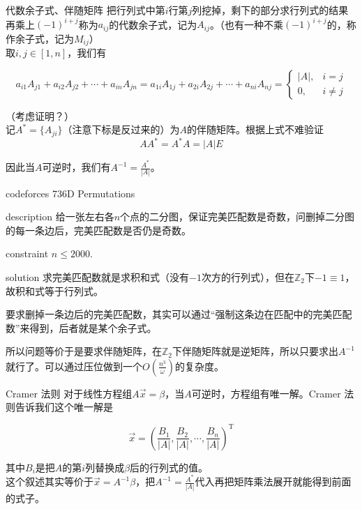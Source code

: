 \documentclass{beamer}
\begin{document}
\begin{frame}{代数余子式、伴随矩阵}
	把行列式中第$i$行第$j$列挖掉，剩下的部分求行列式的结果再乘上$(-1)^{i+j}$称为$a_{ij}$的代数余子式，记为$A_{ij}$。（也有一种不乘$(-1)^{i+j}$的，称作余子式，记为$M_{ij}$）\\
	
	取$i, j \in [1, n]$，我们有
	
	$$a_{i1}A_{j1} + a_{i2}A_{j2} + \cdots + a_{in}A_{jn} = a_{1i}A_{1j} + a_{2i}A_{2j} + \cdots + a_{ni}A_{nj} = \begin{cases}
		|A|, & i=j\\
		0, & i \neq j
	\end{cases}$$
	
	（考虑证明？）\\
	
	记$A^* = \{A_{ji}\}$（注意下标是反过来的）为$A$的伴随矩阵。根据上式不难验证$$AA^* = A^*A = |A|E$$
	
	因此当$A$可逆时，我们有$A^{-1} = \frac{A^*}{|A|}$。
\end{frame}

\begin{frame}{codeforces 736D Permutations}
\begin{block}{description}
	给一张左右各$n$个点的二分图，保证完美匹配数是奇数，问删掉二分图的每一条边后，完美匹配数是否仍是奇数。
\end{block}
\begin{block}{constraint}
	$n \le 2000.$
\end{block}
\pause
\begin{block}{solution}
	求完美匹配数就是求积和式（没有$-1$次方的行列式），但在$\mathbb Z_2$下$-1 \equiv 1$，故积和式等于行列式。
	
	要求删掉一条边后的完美匹配数，其实可以通过“强制这条边在匹配中的完美匹配数”来得到，后者就是某个余子式。
	
	所以问题等价于是要求伴随矩阵，在$\mathbb Z_2$下伴随矩阵就是逆矩阵，所以只要求出$A^{-1}$就行了。可以通过压位做到一个$O(\frac{n^3}{\omega})$的复杂度。
\end{block}
\end{frame}

\begin{frame}{Cramer 法则}
	对于线性方程组$A\vec{x} = \beta$，当$A$可逆时，方程组有唯一解。Cramer 法则告诉我们这个唯一解是
	
	$$\vec{x} = \left( \frac{B_1}{|A|}, \frac{B_2}{|A|}, \cdots, \frac{B_n}{|A|} \right)^{\mathrm T}$$
	
	其中$B_i$是把$A$的第$i$列替换成$\beta$后的行列式的值。\\
	
	这个叙述其实等价于$\vec{x} = A^{-1}\beta$，把$A^{-1} = \frac{A^*}{|A|}$代入再把矩阵乘法展开就能得到前面的式子。
\end{frame}
\end{document}
